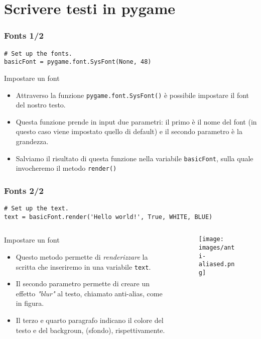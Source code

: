 \documentclass{beamer}
\begin{document}
\section{Scrivere testi in pygame}

\begin{frame}[fragile]
\frametitle{Fonts 1/2}
\begin{lstlisting}
# Set up the fonts.
basicFont = pygame.font.SysFont(None, 48)
\end{lstlisting}
\begin{block}{Impostare un font}
	\begin{itemize}
		\item Attraverso la funzione \texttt{pygame.font.SysFont()} è possibile impostare il font del nostro testo.
		\item Questa funzione prende in input due parametri: il primo è il nome del font (in questo caso viene impostato quello di default) e il secondo parametro è la grandezza.
		\item Salviamo il risultato di questa funzione nella variabile \texttt{basicFont}, sulla quale invocheremo il metodo \texttt{render()}
	\end{itemize}
\end{block}
\end{frame}

\begin{frame}[fragile]
\frametitle{Fonts 2/2}
\begin{lstlisting}
# Set up the text.
text = basicFont.render('Hello world!', True, WHITE, BLUE)
\end{lstlisting}

\begin{columns}
	\begin{column}[T]{0.7\textwidth}
		\begin{block}{Impostare un font}
			\begin{itemize}
				\item Questo metodo permette di \textit{renderizzare} la scritta che inseriremo in una variabile \texttt{text}.
				\item Il secondo parametro permette di creare un effetto \textit{"blur"} al testo, chiamato anti-alias, come in figura.
				\item Il terzo e quarto paragrafo indicano il colore del testo e del backgroun, (sfondo), rispettivamente.
			\end{itemize}
		\end{block}
	\end{column}
	\begin{column}[T]{0.3\textwidth}
		\begin{figure}[t]
			\texttt{[image: images/anti-aliased.png]}
		\end{figure}
	\end{column}
\end{columns}

\end{frame}
\end{document}
